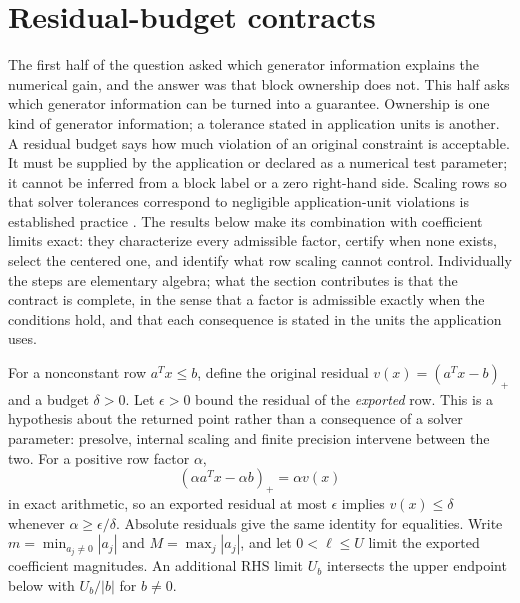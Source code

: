 \section{Residual-budget contracts}
\label{sec:contract}

The first half of the question asked which generator information explains the numerical gain,
and the answer was that block ownership does not. This half asks which generator information
can be turned into a guarantee. Ownership is one kind of generator information; a tolerance
stated in application units is another. A residual budget says how much violation of an original constraint is
acceptable. It must be supplied by the application or declared as a numerical test
parameter; it cannot be inferred from a block label or a zero right-hand side. Scaling rows
so that solver tolerances correspond to negligible application-unit violations is
established practice \cite{gurobiScaling,gurobiExternalScaling,idaesScaling}. The results
below make its combination with coefficient limits exact: they characterize every admissible
factor, certify when none exists, select the centered one, and identify what row scaling
cannot control. Individually the steps are elementary algebra; what the section contributes is
that the contract is complete, in the sense that a factor is admissible exactly when the
conditions hold, and that each consequence is stated in the units the application uses.

For a nonconstant row $a^Tx\le b$, define the original residual $v(x)=(a^Tx-b)_+$ and a
budget $\delta>0$. Let $\epsilon>0$ bound the residual of the \emph{exported} row. This is a
hypothesis about the returned point rather than a consequence of a solver parameter:
presolve, internal scaling and finite precision intervene between the two. For a positive
row factor $\alpha$,
\begin{equation}\label{eq:residual-transfer}
 (\alpha a^Tx-\alpha b)_+=\alpha v(x)
\end{equation}
in exact arithmetic, so an exported residual at most $\epsilon$ implies $v(x)\le\delta$
whenever $\alpha\ge\epsilon/\delta$. Absolute residuals give the same identity for
equalities. Write $m=\min_{a_j\ne0}|a_j|$ and $M=\max_j|a_j|$, and let $0<\ell\le U$ limit
the exported coefficient magnitudes. An additional RHS limit $U_b$ intersects the upper
endpoint below with $U_b/|b|$ for $b\ne0$.

